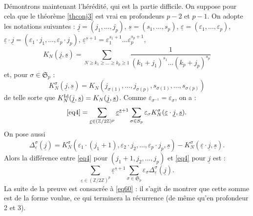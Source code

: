 \documentclass[12pt,francais, reqno]{smfart}
\numberwithin{equation}{section}
\newcommand{\Id}{{\rm Id}}
\newcommand{\Z}{\mathbb Z}
\newcommand{\spp}{{\mathfrak S}_p}
\newcommand{\zdzp}{(\Z / 2 \Z)^p}
\newcommand{\eps}{\varepsilon}
\newcommand{\epssoul}{\underline{\eps}}
\newcommand{\jsoul}{\underline{j}}
\newcommand{\ssoul}{\underline{s}}
\begin{document}
D\'emontrons maintenant l'h\'er\'edit\'e, qui est la partie difficile. On suppose pour cela que 
le th\'eor\`eme \ref{thconj3} est vrai en profondeurs $p-2$ et $p-1$. 
On   adopte les notations suivantes : $\jsoul = (j_1, \ldots , j_p)$, $\ssoul = (s_1, \ldots,  s_p)$,  $\epssoul = (\eps_1, \ldots , \eps_p)$, 
$\epssoul \cdot \jsoul = (\eps_1 \cdot j_1, \ldots , \eps_p \cdot j_p)$, 
$ \epssoul ^{\ssoul + 1}  = \eps_1 ^{s_1+ 1} \ldots  \eps_p ^{s_p+ 1} $, 
$$K_N(\jsoul, \ssoul) = \sum_{N \geq k_1 \geq \ldots  \geq k_p  \geq 1}  \frac{1}{(k_1+j_1)^{s_1} \ldots   (k_p+j_p)^{s_p}}$$
et, pour $\sigma \in \spp$ : 
$$K_N^\sigma (\jsoul, \ssoul)  = K_N (j_{\sigma(1)},\ldots , j_{\sigma(p)}, s_{\sigma(1)}, \ldots , s_{\sigma(p)})$$
de telle sorte que $K_N^{\Id} (\jsoul, \ssoul) = K_N  (\jsoul, \ssoul) $. Comme $\eps_{\sigma^{-1}} = \eps_{\sigma}$, on a : 
$$\eqref{eq4} = \sum_{\epssoul \in \zdzp} \epssoul ^{\ssoul + 1} \sum_{\sigma \in \spp} \eps_\sigma
K_N^\sigma (\epssoul \cdot \jsoul, \ssoul).$$
On pose aussi 
$$\Delta_{\epssoul} ^\sigma (\jsoul) = 
K_N^\sigma (\eps_1 \cdot (j_1+1), \eps_2 \cdot j_2, \ldots,  \eps_p \cdot j_p, \ssoul)
- K_N^\sigma (\epssoul  \cdot \jsoul , \ssoul).$$
Alors la diff\'erence entre \eqref{eq4} pour $(j_1+1, j_2, \ldots , j_p)$ et \eqref{eq4} pour $\jsoul $ est :
\begin{equation} \label{eq60} 
\sum_{\epssoul \in \zdzp} \epssoul ^{\ssoul + 1} \sum_{\sigma \in \spp} \eps_\sigma \Delta_{\epssoul} ^\sigma (\jsoul) .
\end{equation}
La suite de la preuve est consacr\'ee \`a \eqref{eq60} : il s'agit de montrer que cette somme est de la forme voulue, ce qui terminera la r\'ecurrence (de m\^eme qu'en profondeur 2 et 3). 

\bigskip
\end{document}
